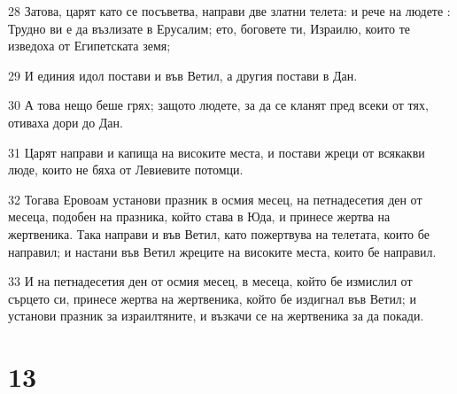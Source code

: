 \par 28 Затова, царят като се посъветва, направи две златни телета: и рече на людете : Трудно ви е да възлизате в Ерусалим; ето, боговете ти, Израилю, които те изведоха от Египетската земя;
\par 29 И единия идол постави и във Ветил, а другия постави в Дан.
\par 30 А това нещо беше грях; защото людете, за да се кланят пред всеки от тях, отиваха дори до Дан.
\par 31 Царят направи и капища на високите места, и постави жреци от всякакви люде, които не бяха от Левиевите потомци.
\par 32 Тогава Еровоам установи празник в осмия месец, на петнадесетия ден от месеца, подобен на празника, който става в Юда, и принесе жертва на жертвеника. Така направи и във Ветил, като пожертвува на телетата, които бе направил; и настани във Ветил жреците на високите места, които бе направил.
\par 33 И на петнадесетия ден от осмия месец, в месеца, който бе измислил от сърцето си, принесе жертва на жертвеника, който бе издигнал във Ветил; и установи празник за израилтяните, и възкачи се на жертвеника за да покади.

\chapter{13}

